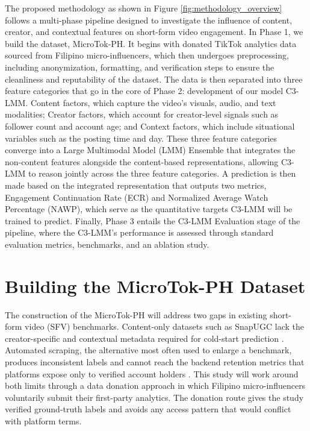 The proposed methodology as shown in Figure \ref{fig:methodology_overview} follows a multi-phase pipeline designed to investigate the influence of content, creator, and contextual features on short-form video engagement. In Phase 1, we build the dataset, MicroTok-PH. It begins with donated TikTok analytics data sourced from Filipino micro-influencers, which then undergoes preprocessing, including anonymization, formatting, and verification steps to ensure the cleanliness and reputability of the dataset. The data is then separated into three feature categories that go in the core of Phase 2: development of our model C3-LMM. Content factors, which capture the video's visuals, audio, and text modalities; Creator factors, which account for creator-level signals such as follower count and account age; and Context factors, which include situational variables such as the posting time and day. These three feature categories converge into a Large Multimodal Model (LMM) Ensemble that integrates the non-content features alongside the content-based representations, allowing C3-LMM to reason jointly across the three feature categories. A prediction is then made based on the integrated representation that outputs two metrics, Engagement Continuation Rate (ECR) and Normalized Average Watch Percentage (NAWP), which serve as the quantitative targets C3-LMM will be trained to predict. Finally, Phase 3 entails the C3-LMM Evaluation stage of the pipeline, where the C3-LMM's performance is assessed through standard evaluation metrics, benchmarks, and an ablation study.


\section{Building the MicroTok-PH Dataset}

The construction of the MicroTok-PH will address two gaps in existing short-form video (SFV) benchmarks. Content-only datasets such as SnapUGC lack the creator-specific and contextual metadata required for cold-start prediction \cite{li2024delving}. Automated scraping, the alternative most often used to enlarge a benchmark, produces inconsistent labels and cannot reach the backend retention metrics that platforms expose only to verified account holders \cite{li2025vquala}. This study will work around both limits through a data donation approach in which Filipino micro-influencers voluntarily submit their first-party analytics. The donation route gives the study verified ground-truth labels and avoids any access pattern that would conflict with platform terms.

